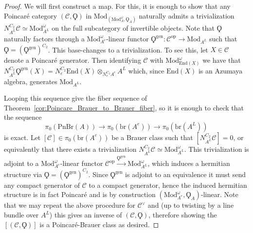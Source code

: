 \documentclass{article}
\newcommand{\op}{\mathrm{op}} %
\newcommand{\pnbr}{\ensuremath{\mathrm{PnBr}}}
\theoremstyle{definition}
\begin{document}
    \begin{proof}
        We will first construct a map. For this, it is enough to show that any Poincar{\'e} category $(\mathcal{C},\Qoppa)$ in $\mathrm{Mod}_{(\mathrm{Mod}_{A}^\omega, \Qoppa_A)}$ naturally admits a trivialization $N^{C_2}_{A^L}\mathcal{C}\simeq \mathrm{Mod}_{A^L}^\omega$ on the full subcategory of invertible objects. Note that $\Qoppa$ naturally factors through a $\mathrm{Mod}_{A^e}^\omega$-linear functor $\Qoppa^{\text{gen}}:\mathcal{C}^\op \to \mathrm{Mod}_{A^L}$ such that $\Qoppa = (\Qoppa^{\text{gen}})^{C_2}$. This base-changes to a trivialization. To see this, let $X\in \mathcal{C}$ denote a Poincar{\'e} generator. Then identifying $\mathcal{C}$ with $\mathrm{Mod}_{\mathrm{End}(X)}^\omega$ we have that $N^{C_2}_{A^L}\Qoppa^{\text{gen}}(X)=N^{C_2}_{e}\mathrm{End}(X)\otimes_{N_e^{C_2}A^e}A^L$ which, since $\mathrm{End}(X)$ is an Azumaya algebra, generates $\mathrm{Mod}_{A^L}$. 
        
        Looping this sequence give the fiber sequence of Theorem~\ref{cor:Poincare_Brauer_to_Brauer_fiber}, so it is enough to check that the sequence \[\pi_0(\pnbr(A))\to \pi_0(\mathrm{br}(A^e))\to \pi_0(\mathrm{br}(A^L))\] is exact. Let $[\mathcal{C}]\in \pi_0(\mathrm{br}(A^e))$ be a Brauer class such that $[N^{C_2}_{A^L}\mathcal{C}]=0$, or equivalently that there exists a trivialization $N^{C_2}_{A^L}\mathcal{C}\simeq \mathrm{Mod}_{A^L}^\omega$. This trivialization is adjoint to a $\mathrm{Mod}_{A^e}^\omega$-linear functor $\mathcal{C}^{\op}\xrightarrow{\Qoppa^{\text{gen}}}\mathrm{Mod}_{A^L}^\omega$, which induces a hermitian structure via $\Qoppa=(\Qoppa^{\text{gen}})^{C_2}$. Since $\Qoppa^{\text{gen}}$ is adjoint to an equivalence it must send any compact generator of $\mathcal{C}$ to a compact generator, hence the induced hermitian structure is in fact Poincar{\'e} and is by construction $(\mathrm{Mod}_{A^e}^\omega, \Qoppa_A)$-linear. Note that we may repeat the above procedure for $\mathcal{C}^\vee$ and (up to twisting by a line bundle over $A^L$) this gives an inverse of $(\mathcal{C},\Qoppa)$, therefore showing the $[(\mathcal{C},\Qoppa)]$ is a Poincar{\'e}-Brauer class as desired.
    \end{proof}
\end{document}
